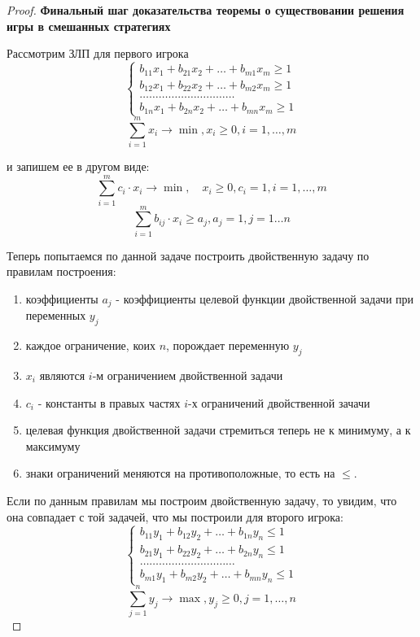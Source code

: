 \documentclass[aps,%
12pt,%
final,%
oneside,
onecolumn,%
musixtex, %
superscriptaddress,%
centertags]{article} %
\theoremstyle{plain}
\theoremstyle{definition}
\theoremstyle{remark}
\begin{document}
\begin{proof}
\textbf{Финальный шаг доказательства теоремы о существовании решения игры в смешанных стратегиях}

Рассмотрим ЗЛП для первого игрока
$$\begin{cases}
  b_{11}x_1+b_{21}x_2 + \ldots + b_{m1}x_m \geq 1 \\
  b_{12}x_1+b_{22}x_2 + \ldots + b_{m2}x_m \geq 1 \\
  \ldots \ldots \ldots \ldots \ldots\ldots \ldots \ldots \ldots \ldots  \\
  b_{1n}x_1+b_{2n}x_2 + \ldots + b_{mn}x_m \geq 1
\end{cases}$$
$$\sum\limits_{i=1}^m x_i \to \min, x_i \geq 0, i = 1,\ldots,m$$

и запишем ее в другом виде:
$$\sum\limits_{i=1}^m c_i \cdot x_i \to \min,\quad  x_i \geq 0, c_i=1, i =1,\ldots,m$$
$$\sum\limits_{i=1}^m b_{ij} \cdot x_i \geq a_j, a_j = 1, j = 1 \ldots n$$

Теперь попытаемся по данной задаче построить двойственную задачу по правилам построения:

\begin{enumerate}
  \item коэффициенты $a_j$ - коэффициенты целевой функции двойственной задачи при переменных $y_j$
  \item каждое ограничение, коих $n$, порождает переменную $y_j$
  \item $x_i$ являются $i$-м ограничением двойственной задачи
  \item $c_i$ - константы в правых частях $i$-х ограничений двойственной зачачи
  \item целевая функция двойственной задачи стремиться теперь не к минимуму, а к максимуму
  \item знаки ограничений меняются на противоположные, то есть на $\leq$. 
\end{enumerate}

Если по данным правилам мы построим двойственную задачу, то увидим, что она совпадает с той задачей, что мы построили для второго игрока:
$$\begin{cases}
  b_{11}y_1+b_{12}y_2 + \ldots + b_{1n}y_n \leq 1 \\
  b_{21}y_1+b_{22}y_2 + \ldots + b_{2n}y_n \leq 1 \\
  \ldots \ldots \ldots \ldots \ldots\ldots \ldots \ldots \ldots \ldots  \\
  b_{m1}y_1+b_{m2}y_2 + \ldots + b_{mn}y_n \leq 1
\end{cases}$$
$$\sum\limits_{j=1}^n y_j \to \max, y_j \geq 0, j = 1,\ldots,n$$


\end{proof}
\end{document}
